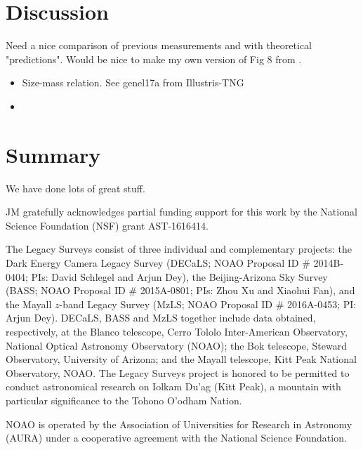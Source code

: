 \documentclass[twocolumn]{aastex62}
\begin{document}
\section{Discussion}\label{sec:discussion}

Need a nice comparison of previous measurements and with theoretical "predictions".  Would be nice to make my own version of Fig 8 from \citet{wechsler18a}.  

\begin{itemize}
\item{Size-mass relation.  See genel17a from Illustris-TNG}
\item{}
\end{itemize}

\section{Summary}\label{sec:conclusions}

We have done lots of great stuff.

\clearpage

\acknowledgements

JM gratefully acknowledges partial funding support for this work by the National Science Foundation (NSF) grant AST-1616414.

The Legacy Surveys consist of three individual and complementary projects: the Dark Energy Camera Legacy Survey (DECaLS; NOAO Proposal ID \# 2014B-0404; PIs: David Schlegel and Arjun Dey), the Beijing-Arizona Sky Survey (BASS; NOAO Proposal ID \# 2015A-0801; PIs: Zhou Xu and Xiaohui Fan), and the Mayall $z$-band  Legacy Survey (MzLS; NOAO Proposal ID \# 2016A-0453; PI: Arjun Dey). DECaLS, BASS and MzLS together include data obtained, respectively, at the Blanco telescope, Cerro Tololo Inter-American Observatory, National Optical Astronomy Observatory (NOAO); the Bok telescope, Steward Observatory, University of Arizona; and the Mayall telescope, Kitt Peak National Observatory, NOAO. The Legacy Surveys project is honored to be permitted to conduct astronomical research on Iolkam Du'ag (Kitt Peak), a mountain with particular significance to the Tohono O'odham Nation.

NOAO is operated by the Association of Universities for Research in Astronomy (AURA) under a cooperative agreement with the National Science Foundation.
\end{document}
